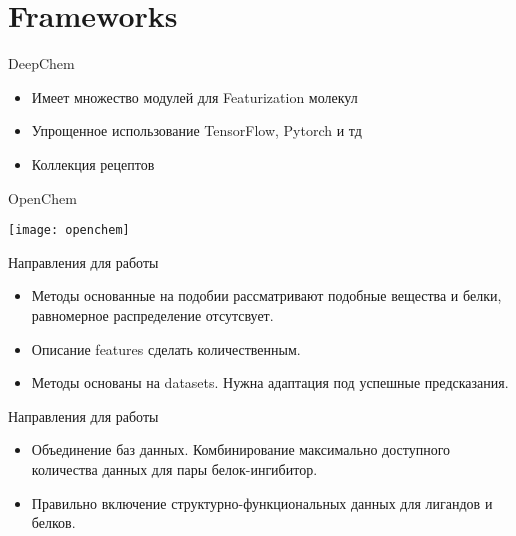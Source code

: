 \section{Frameworks}

\begin{frame}{DeepChem}
    
    \begin{itemize}
        \item Имеет множество модулей для Featurization  молекул 
        \item Упрощенное использование TensorFlow, Pytorch и тд
        \item Коллекция рецептов
    \end{itemize}
\end{frame}

\begin{frame}{OpenChem}

    \texttt{[image: openchem]}
\end{frame}

\begin{frame}{Направления для работы}
    \begin{itemize}
        \item Методы основанные на подобии рассматривают подобные вещества и белки, равномерное распределение отсутсвует.
            \vspace{.2cm}
        \item Описание features сделать количественным.
            \vspace{.2cm}
        \item Методы основаны на datasets. Нужна адаптация под успешные предсказания.
        \end{itemize}
\end{frame}

\begin{frame}{Направления для работы}
    \begin{itemize}
        \item Объединение баз данных. Комбинирование максимально доступного количества данных для пары белок-ингибитор.
            \vspace{.2cm}
        \item Правильно включение структурно-функциональных данных для лигандов и белков.
            \vspace{.2cm}
        \end{itemize}
\end{frame}
